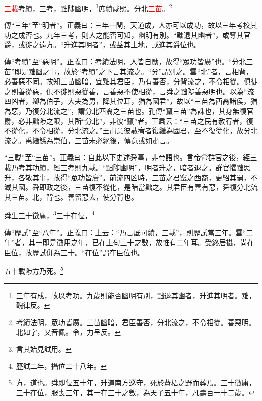 \textcolor{red}{三載}考績，三考，黜陟幽明，\footnote{三年有成，故以考功。九歲則能否幽明有別，黜退其幽者，升進其明者。黜，醜律反。}庶績咸熙。分北\textcolor{red}{三苗}。\footnote{考績法明，眾功皆廣。三苗幽暗，君臣善否，分北流之，不令相從。善惡明。北如字，又音佩。令，力呈反。}

{\noindent\zhuan{}\fzbyks 傳“三年”至“明者”。正義曰：三年一閏，天道成，人亦可以成功，故以三年考校其功之成否也。九年三考，則人之能否可知，幽明有別。“黜退其幽者”，或奪其官爵，或徙之遠方。“升進其明者”，或益其土地，或進其爵位也。 \par}

{\noindent\zhuan{}\fzbyks 傳“考績”至“惡明”。正義曰：考績法明，人皆自勵，故得“眾功皆廣”也。“分北三苗”即是黜幽之事，故於“考績”之下言其流之。“分”謂別之。雲“北”者，言相背，必善惡不同。故知三苗幽暗，宜黜其君臣，乃有善否，分背流之，不令相從。俱徙之則善從惡，俱不徙則惡從善，言善惡不使相從，言舜之黜陟善惡明也。以為“流四凶者，卿為伯子，大夫為男，降其位耳，猶為國君”，故以“三苗為西裔諸侯，猶為惡，乃復分北流之”，謂分北西裔之三苗也。孔傳“竄三苗”為誅也，其身無復官爵，必非黜陟之限，其所“分北”，非彼“竄”者。王肅云：“三苗之民有赦宥者，復不從化，不令相從，分北流之。”王肅意彼赦宥者復繼為國君，至不復從化，故分北流之。禹繼鯀為崇伯，三苗未必絕後，傳意或如肅言。 \par}

{\noindent\shu{}\fzkt “三載”至“三苗”。正義曰：自此以下史述舜事，非帝語也。言帝命群官之後，經三載乃考其功績，經三考則九載。“黜陟幽明”，明者升之，暗者退之。群官懼黜思升，各敬其事，故得“眾功皆廣”。前流四凶時，三苗之君竄之西裔，更紹其嗣，不滅其國。舜即政之後，三苗復不從化，是暗當黜之。其君臣有善有惡，舜復分北流其三苗。北，背也。善留惡去，使分背也。 \par}

舜生三十徵庸，\footnote{言其始見試用。}三十在位，\footnote{歷試二年，攝位二十八年。}

{\noindent\zhuan{}\fzbyks 傳“歷試”至“八年”。正義曰：上云：“乃言厎可績，三載”，則歷試當三年。雲“二年”者，其一即是徵用之年，已在上句三十之數，故惟有二年耳。受終居攝，尚在臣位，故歷試併為三十。“在位”謂在臣位也。 \par}

五十載陟方乃死。\footnote{方，道也。舜即位五十年，升道南方巡守，死於蒼梧之野而葬焉。三十徵庸，三十在位，服喪三年，其一在三十之數，為天子五十年，凡壽百一十二歲。}

